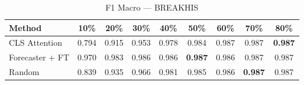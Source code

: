 \begin{table}[h]
\caption{F1 Macro — BREAKHIS}
\begin{tabular}{lcccccccc}
\toprule
Method & 10\% & 20\% & 30\% & 40\% & 50\% & 60\% & 70\% & 80\% \\
\midrule
CLS Attention & 0.794 & 0.915 & 0.953 & 0.978 & 0.984 & 0.987 & 0.987 & \textbf{0.987} \\
Forecaster + FT & 0.970 & 0.983 & 0.986 & 0.986 & \textbf{0.987} & 0.986 & 0.987 & 0.987 \\
Random & 0.839 & 0.935 & 0.966 & 0.981 & 0.985 & 0.986 & \textbf{0.987} & 0.987 \\
\bottomrule
\end{tabular}
\end{table}